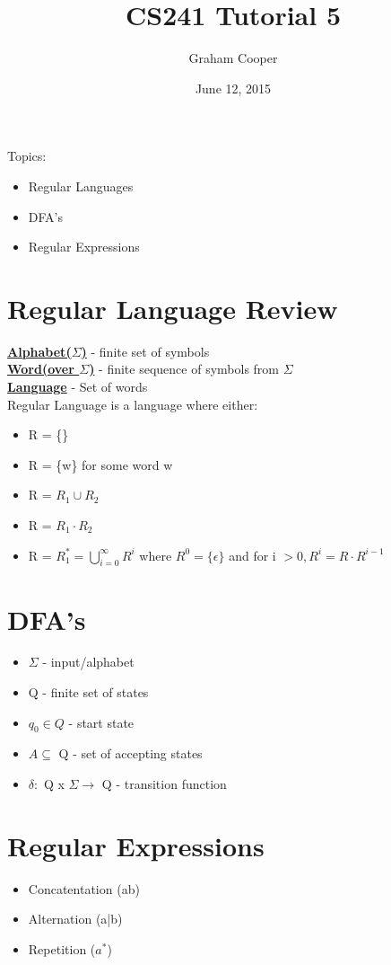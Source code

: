 \documentclass[12pt]{article}
\title{\vspace{-15ex}CS241 Tutorial 5\vspace{-1ex}}
\date{June 12, 2015}
\author{Graham Cooper}
\newcommand{\myt}[1]{\textbf{\underline{#1}}}
\begin{document}
	\maketitle
	Topics:
	\begin{itemize}
		\item Regular Languages
		\item DFA's
		\item Regular Expressions
	\end{itemize}
	
	\section*{Regular Language Review}
	\myt{Alphabet($\Sigma$)} - finite set of symbols\\
	\myt{Word(over $\Sigma$)} - finite sequence of symbols from $\Sigma$\\
	\myt{Language} - Set of words\\
	
	Regular Language is a language where either:\\
	\begin{itemize}
		\item R = \{\}
		\item R = \{w\} for some word w
		\item R = $R_1 \cup R_2$
		\item R = $R_1 \cdot R_2$
		\item R = $R_1^* = \bigcup_{i=0}^{\infty}R^i$ where $R^0 = \{\epsilon \}$ and for i $>0,R^i = R \cdot R^{i-1}$
	\end{itemize}
	
	\section*{DFA's}
	\begin{itemize}
		\item $\Sigma$ - input/alphabet
		\item Q - finite set of states
		\item $q_0 \in Q$ - start state
		\item $A \subseteq$ Q - set of accepting states
		\item $\delta:$ Q x $\Sigma \rightarrow$ Q - transition function
	\end{itemize}
	
	\section*{Regular Expressions}
	\begin{itemize}
		\item Concatentation (ab)
		\item Alternation (a|b)
		\item Repetition ($a^*$)
	\end{itemize}
	
\end{document}
